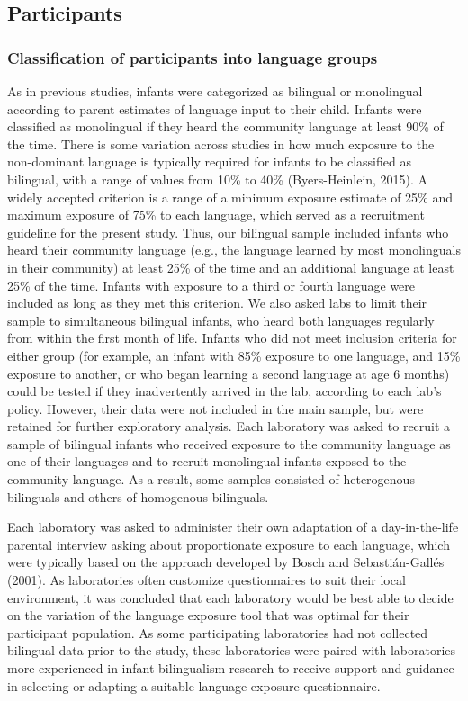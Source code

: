\documentclass[,man,floatsintext]{apa6}
\begin{document}
\hypertarget{participants}{%
\subsection{Participants}\label{participants}}

\hypertarget{classification-of-participants-into-language-groups}{%
\subsubsection{Classification of participants into language groups}\label{classification-of-participants-into-language-groups}}

As in previous studies, infants were categorized as bilingual or monolingual according to parent estimates of language input to their child. Infants were classified as monolingual if they heard the community language at least 90\% of the time. There is some variation across studies in how much exposure to the non-dominant language is typically required for infants to be classified as bilingual, with a range of values from 10\% to 40\% (Byers-Heinlein, 2015). A widely accepted criterion is a range of a minimum exposure estimate of 25\% and maximum exposure of 75\% to each language, which served as a recruitment guideline for the present study. Thus, our bilingual sample included infants who heard their community language (e.g., the language learned by most monolinguals in their community) at least 25\% of the time and an additional language at least 25\% of the time. Infants with exposure to a third or fourth language were included as long as they met this criterion. We also asked labs to limit their sample to simultaneous bilingual infants, who heard both languages regularly from within the first month of life. Infants who did not meet inclusion criteria for either group (for example, an infant with 85\% exposure to one language, and 15\% exposure to another, or who began learning a second language at age 6 months) could be tested if they inadvertently arrived in the lab, according to each lab's policy. However, their data were not included in the main sample, but were retained for further exploratory analysis. Each laboratory was asked to recruit a sample of bilingual infants who received exposure to the community language as one of their languages and to recruit monolingual infants exposed to the community language. As a result, some samples consisted of heterogenous bilinguals and others of homogenous bilinguals.

Each laboratory was asked to administer their own adaptation of a day-in-the-life parental interview asking about proportionate exposure to each language, which were typically based on the approach developed by Bosch and Sebastián-Gallés (2001). As laboratories often customize questionnaires to suit their local environment, it was concluded that each laboratory would be best able to decide on the variation of the language exposure tool that was optimal for their participant population. As some participating laboratories had not collected bilingual data prior to the study, these laboratories were paired with laboratories more experienced in infant bilingualism research to receive support and guidance in selecting or adapting a suitable language exposure questionnaire.
\end{document}
